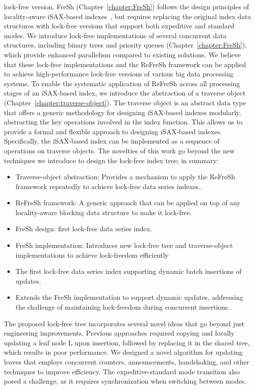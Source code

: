 lock-free version. FreSh (Chapter~\ref{chapter:FreSh}) follows the design principles of locality-aware
iSAX-based indexes~\cite{isaxfamily,PFP21-I}, but requires replacing the original index data structures
with lock-free versions that support both expeditive and standard modes. We introduce lock-free
implementations of several concurrent data structures, including binary trees and priority queues
(Chapter~\ref{chapter:FreSh}), which provide enhanced parallelism compared to existing solutions.
%
We believe that these lock-free implementations and the ReFreSh framework can be applied to
achieve high-performance lock-free versions of various big data processing systems.
%
To enable the systematic application of ReFreSh across all processing stages of an iSAX-based index,
we introduce the abstraction of a traverse object (Chapter~\ref{chapter:traverse-object}). The traverse object
is an abstract data type that offers a generic methodology for designing iSAX-based indexes modularly,
abstracting the key operations involved in the index function. This allows us to provide a
formal and flexible approach to designing iSAX-based indexes.
Specifically, the iSAX-based index can be implemented as a sequence of operations on traverse objects. 
%
The novelties of this work go beyond the new techniques we introduce to design the
lock-free index tree; in summary:
\begin{itemize}
\item Traverse-object abstraction: Provides a mechanism to apply the ReFreSh framework repeatedly to achieve lock-free data 
    series indexes..
\item ReFreSh framework: A generic approach that can be applied on top of any locality-aware blocking data structure to make it lock-free.
\item FreSh design: first lock-free data series index.
\item FreSh implementation: Introduces new lock-free tree and traverse-object implementations to achieve lock-freedom efficiently
\item The first lock-free data series index supporting dynamic batch insertions of updates.
\item Extends the FreSh implementation to support dynamic updates, addressing the challenge of maintaining lock-freedom during concurrent insertions..
\end{itemize}
The proposed lock-free tree incorporates several novel ideas that go beyond just engineering 
improvements. Previous approaches required copying and locally updating a leaf node L upon insertion,
followed by replacing it in the shared tree, which results in poor performance. We designed a novel
algorithm for updating leaves that employs concurrent counters, announcements, handshaking, and
other techniques to improve efficiency. The expeditive-standard mode transition also posed a
challenge, as it requires synchronization when switching between modes.


